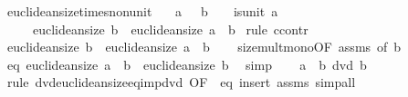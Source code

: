 \begin{isabellebody}
\endisatagproof
{\isafoldproof}%
%
\isadelimproof
\isanewline
%
\endisadelimproof
\isanewline
{}\isamarkupfalse%
\ euclidean{\isacharunderscore}{\kern0pt}size{\isacharunderscore}{\kern0pt}times{\isacharunderscore}{\kern0pt}nonunit{\isacharcolon}{\kern0pt}\isanewline
\ \ \ {\isachardoublequoteopen}a\ {\isasymnoteq}\ {}{\isachardoublequoteclose}\ {\isachardoublequoteopen}b\ {\isasymnoteq}\ {}{\isachardoublequoteclose}\ {\isachardoublequoteopen}{\isasymnot}\ is{\isacharunderscore}{\kern0pt}unit\ a{\isachardoublequoteclose}\isanewline
\ \ \ \ \ {\isachardoublequoteopen}euclidean{\isacharunderscore}{\kern0pt}size\ b\ {\isacharless}{\kern0pt}\ euclidean{\isacharunderscore}{\kern0pt}size\ {\isacharparenleft}{\kern0pt}a\ {\isacharasterisk}{\kern0pt}\ b{\isacharparenright}{\kern0pt}{\isachardoublequoteclose}\isanewline
%
\isadelimproof
%
\endisadelimproof
%
\isatagproof
{}\isamarkupfalse%
\ {\isacharparenleft}{\kern0pt}rule\ ccontr{\isacharparenright}{\kern0pt}\isanewline
\ \ \isamarkupfalse%
\ {\isachardoublequoteopen}{\isasymnot}euclidean{\isacharunderscore}{\kern0pt}size\ b\ {\isacharless}{\kern0pt}\ euclidean{\isacharunderscore}{\kern0pt}size\ {\isacharparenleft}{\kern0pt}a\ {\isacharasterisk}{\kern0pt}\ b{\isacharparenright}{\kern0pt}{\isachardoublequoteclose}\isanewline
\ \ \isamarkupfalse%
\ size{\isacharunderscore}{\kern0pt}mult{\isacharunderscore}{\kern0pt}mono{\isacharprime}{\kern0pt}{\isacharbrackleft}{\kern0pt}OF\ assms{\isacharparenleft}{\kern0pt}{}{\isacharparenright}{\kern0pt}{\isacharcomma}{\kern0pt}\ of\ b{\isacharbrackright}{\kern0pt}\ \isanewline
\ \ \ \ \isamarkupfalse%
\ eq{\isacharcolon}{\kern0pt}\ {\isachardoublequoteopen}euclidean{\isacharunderscore}{\kern0pt}size\ {\isacharparenleft}{\kern0pt}a\ {\isacharasterisk}{\kern0pt}\ b{\isacharparenright}{\kern0pt}\ {\isacharequal}{\kern0pt}\ euclidean{\isacharunderscore}{\kern0pt}size\ b{\isachardoublequoteclose}\ \isamarkupfalse%
\ simp\isanewline
\ \ \isamarkupfalse%
\ {\isachardoublequoteopen}a\ {\isacharasterisk}{\kern0pt}\ b\ dvd\ b{\isachardoublequoteclose}\isanewline
\ \ \ \ \isamarkupfalse%
\ {\isacharparenleft}{\kern0pt}rule\ dvd{\isacharunderscore}{\kern0pt}euclidean{\isacharunderscore}{\kern0pt}size{\isacharunderscore}{\kern0pt}eq{\isacharunderscore}{\kern0pt}imp{\isacharunderscore}{\kern0pt}dvd\ {\isacharbrackleft}{\kern0pt}OF\ {\isacharunderscore}{\kern0pt}\ eq{\isacharbrackright}{\kern0pt}{\isacharparenright}{\kern0pt}\ {\isacharparenleft}{\kern0pt}insert\ assms{\isacharcomma}{\kern0pt}\ simp{\isacharunderscore}{\kern0pt}all{\isacharparenright}{\kern0pt}\isanewline

\end{isabellebody}
